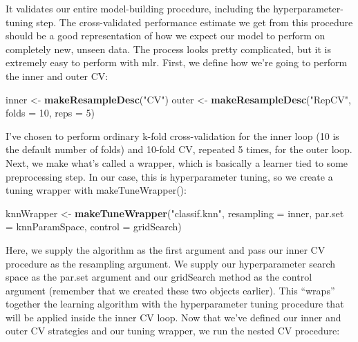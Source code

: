 \documentclass[
]{article}
\newenvironment{Shaded}{\begin{snugshade}}{\end{snugshade}}
\newcommand{\AttributeTok}[1]{\textcolor[rgb]{0.13,0.29,0.53}{#1}}
\newcommand{\DecValTok}[1]{\textcolor[rgb]{0.00,0.00,0.81}{#1}}
\newcommand{\FunctionTok}[1]{\textcolor[rgb]{0.13,0.29,0.53}{\textbf{#1}}}
\newcommand{\NormalTok}[1]{#1}
\newcommand{\OtherTok}[1]{\textcolor[rgb]{0.56,0.35,0.01}{#1}}
\newcommand{\StringTok}[1]{\textcolor[rgb]{0.31,0.60,0.02}{#1}}
\begin{document}
It validates our entire model-building procedure, including the
hyperparameter-tuning step. The cross-validated performance estimate we
get from this procedure should be a good representation of how we expect
our model to perform on completely new, unseen data. The process looks
pretty complicated, but it is extremely easy to perform with mlr. First,
we define how we're going to perform the inner and outer CV:

\begin{Shaded}
\begin{Highlighting}[]
\NormalTok{inner }\OtherTok{\textless{}{-}} \FunctionTok{makeResampleDesc}\NormalTok{(}\StringTok{"CV"}\NormalTok{)}
\NormalTok{outer }\OtherTok{\textless{}{-}} \FunctionTok{makeResampleDesc}\NormalTok{(}\StringTok{"RepCV"}\NormalTok{, }\AttributeTok{folds =} \DecValTok{10}\NormalTok{, }\AttributeTok{reps =} \DecValTok{5}\NormalTok{)}
\end{Highlighting}
\end{Shaded}

I've chosen to perform ordinary k-fold cross-validation for the inner
loop (10 is the default number of folds) and 10-fold CV, repeated 5
times, for the outer loop. Next, we make what's called a wrapper, which
is basically a learner tied to some preprocessing step. In our case,
this is hyperparameter tuning, so we create a tuning wrapper with
makeTuneWrapper():

\begin{Shaded}
\begin{Highlighting}[]
\NormalTok{knnWrapper }\OtherTok{\textless{}{-}} \FunctionTok{makeTuneWrapper}\NormalTok{(}\StringTok{"classif.knn"}\NormalTok{, }\AttributeTok{resampling =}\NormalTok{ inner, }
                              \AttributeTok{par.set =}\NormalTok{ knnParamSpace,}
                              \AttributeTok{control =}\NormalTok{ gridSearch)}
\end{Highlighting}
\end{Shaded}

Here, we supply the algorithm as the first argument and pass our inner
CV procedure as the resampling argument. We supply our hyperparameter
search space as the par.set argument and our gridSearch method as the
control argument (remember that we created these two objects earlier).
This ``wraps'' together the learning algorithm with the hyperparameter
tuning procedure that will be applied inside the inner CV loop. Now that
we've defined our inner and outer CV strategies and our tuning wrapper,
we run the nested CV procedure:
\end{document}
